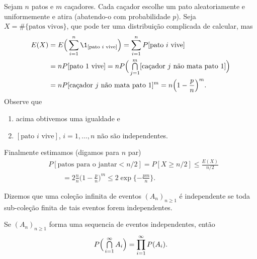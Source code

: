 \begin{example}
  Sejam $n$ patos e $m$ caçadores.
  Cada caçador escolhe um pato aleatoriamente e uniformemente e atira (abatendo-o com probabilidade $p$).
  Seja $X = \# \{\text{patos vivos}\}$, que pode ter uma distribuição complicada de calcular, mas
  \begin{equation}
    \begin{split}
      E(X)
      & = E \Big( \sum_{i=1}^n \1_{[\text{pato $i$ vive}]} \Big)
        = \sum_{i=1}^n P[\text{pato $i$ vive}]\\
      & = n P[\text{pato $1$ vive}]
        = n P\Big(
        \mcap_{j=1}^m [\text{caçador $j$ não mata pato $1$}]
        \Big)\\
      & = n P[\text{caçador $j$ não mata pato $1$}]^m
        = n \Big(1 - \frac{p}{n}\Big)^m.
    \end{split}
  \end{equation}
  Observe que
  \begin{enumerate}[\quad a)]
  \item acima obtivemos uma igualdade e
  \item $[\text{pato $i$ vive}]$, $i = 1, \dots, n$ não são independentes.
  \end{enumerate}

  Finalmente estimamos (digamos para $n$ par)
  \begin{equation}
    \begin{split}
      & P[\text{patos para o jantar} < n/2] = P[X \geq n/2] \leq \frac{E(X)}{n/2}\\
      & \qquad = 2 \frac{n}{n} \Big( 1 - \frac{p}{n}\Big)^m \leq 2 \exp \{- \frac{pm}{n}\}.
    \end{split}
  \end{equation}
\end{example}

\begin{definition}
  Dizemos que uma coleção infinita de eventos $(A_n)_{n\ge 1}$ é independente  se toda sub-coleção finita de tais eventos forem independentes.
\end{definition}

\begin{lemma}
  Se $(A_n)_{n\ge 1}$ forma uma sequencia de eventos independentes, então
  \begin{equation}
    P\Big( \operatorname*{{\textstyle \bigcap}}_{i=1}^{\infty} A_i \Big) = \prod\limits_{i=1}^{\infty} P(A_i).
  \end{equation}
\end{lemma}

